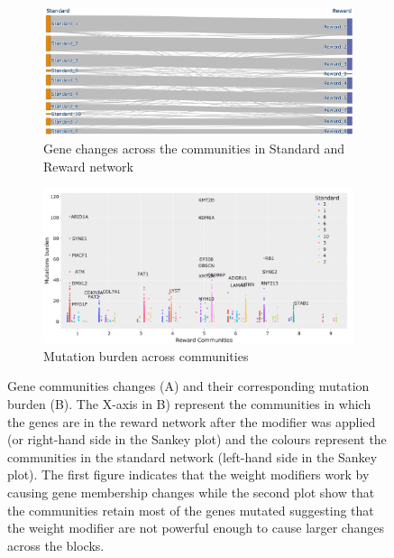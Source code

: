 \begin{figure}[!htb]
    \centering
    \begin{subfigure}[!t]{1.0\textwidth}
        \includegraphics[width=\textwidth,keepaspectratio]{Sections/Network_I/Resources/P0/Comms/Sky_Comm_Comp_4K_v3.png}
        \caption{Gene changes across the communities in Standard and Reward network}
        \label{fig:N_I:p0_chg_sankey}
    \end{subfigure}
    \begin{subfigure}[!t]{1.0\textwidth}
        \includegraphics[width=\textwidth,keepaspectratio]{Sections/Network_I/Resources/P0/Comms/Mut_Comm_Comp_4K_v3.png}
        \caption{Mutation burden across communities}
        \label{fig:N_I:p0_chg_mut}
    \end{subfigure}
    \caption[Gene migrations between communities]{Gene communities changes (A) and their corresponding mutation burden (B). The X-axis in B) represent the communities in which the genes are in the reward network after the modifier was applied (or right-hand side in the Sankey plot) and the colours represent the communities in the standard network (left-hand side in the Sankey plot). The first figure indicates that the weight modifiers work by causing gene membership changes while the second plot show that the communities retain most of the genes mutated suggesting that the weight modifier are not powerful enough to cause larger changes across the blocks. }
    \label{fig:N_I:p0_comm_chgs_1}
\end{figure}



